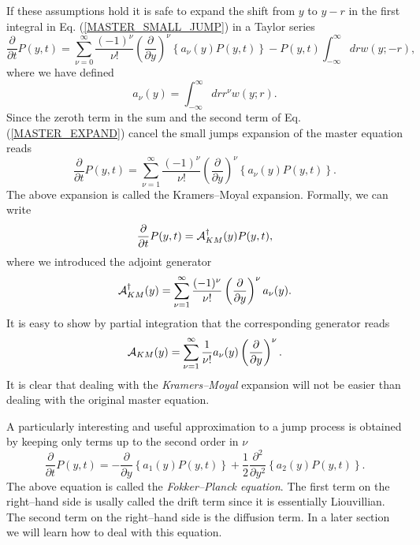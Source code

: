 If these assumptions hold it is safe to expand the shift from $y$
to $y-r$ in the first integral in 
Eq. (\ref{MASTER_SMALL_JUMP}) in a Taylor series
\begin{equation}
\label{MASTER_EXPAND}
\frac{\partial}{\partial t} P(y,t) = \sum_{\nu=0}^{\infty}
   \frac{(-1)^{\nu}}{\nu!} \left( \frac{\partial}{\partial y} 
   \right)^{\nu}
    \left\{  a_{\nu}(y) P(y,t) \right\}
    - P(y,t) \int_{-\infty}^{\infty} dr w(y;-r),
\end{equation}
where we have defined
\begin{equation*}
a_{\nu}(y) = \int_{-\infty}^{\infty} dr r^{\nu} w(y;r).
\end{equation*}
Since the zeroth term in the sum and the second term of 
Eq. (\ref{MASTER_EXPAND}) cancel the small jumps expansion 
of the master equation reads
\begin{equation}
\frac{\partial}{\partial t} P(y,t) = \sum_{\nu=1}^{\infty}
   \frac{(-1)^{\nu}}{\nu!} \left( \frac{\partial}{\partial y} 
   \right)^{\nu}
    \left\{  a_{\nu}(y) P(y,t) \right\}.
\end{equation}
The above expansion is called the Kramers--Moyal expansion. 
Formally, we can write
\begin{equation}
\frac{\partial}{\partial t} P(y,t) = {\cal{A}}_{KM}^{\dagger}(y)
         P(y,t),
\end{equation}
where we introduced the adjoint generator
\begin{equation*}
{\cal{A}}_{KM}^{\dagger}(y) = \sum_{\nu=1}^{\infty}
   \frac{(-1)^{\nu}}{\nu!} \left( \frac{\partial}{\partial y} 
   \right)^{\nu}
     a_{\nu}(y).
\end{equation*}
It is easy to show by partial integration that the corresponding
generator  reads
\begin{equation*}
{\cal{A}}_{KM}(y) = \sum_{\nu=1}^{\infty}
   \frac{1}{\nu!}  a_{\nu}(y)
    \left( \frac{\partial}{\partial y} 
   \right)^{\nu}.
\end{equation*}
It is clear that dealing with the {\em Kramers--Moyal} expansion will 
not be easier than dealing with the original master equation.

A particularly interesting and useful approximation to a jump process is 
obtained by keeping only terms up to the second order in $\nu$
\begin{equation}
\label{FOKKER_PLANCK}
\frac{\partial}{\partial t} P(y,t) =
-\frac{\partial}{\partial y} \left\{ a_1(y) P(y,t) \right\}
   + \frac{1}{2} \frac{\partial^2}{\partial y^2} 
      \left\{ a_2(y) P(y,t) \right\}.
\end{equation}
The above equation is called the {\em Fokker--Planck equation}.
The first term on the right--hand side is usally called the drift
term since it is essentially Liouvillian. The second term
on the right--hand side is the diffusion term. In a later section
we will learn how to deal with this equation.

